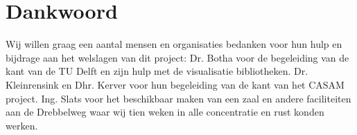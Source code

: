 \section{Dankwoord}
\label{Dankwoord}
Wij willen graag een aantal mensen en organisaties bedanken voor hun hulp en bijdrage aan het welslagen van dit project:
Dr. Botha voor de begeleiding van de kant van de TU Delft en zijn hulp met de visualisatie bibliotheken.
Dr. Kleinrensink en Dhr. Kerver voor hun begeleiding van de kant van het CASAM project.
Ing. Slats voor het beschikbaar maken van een zaal en andere faciliteiten aan de Drebbelweg waar wij tien weken in alle concentratie en rust konden werken.

